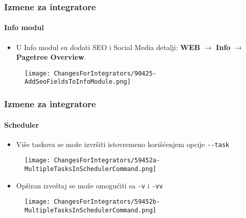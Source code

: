 
\begin{frame}[fragile]
	\frametitle{Izmene za integratore}
	\framesubtitle{Info modul}

	\begin{itemize}
		\item U Info modul su dodati SEO i Social Media detalji:\newline
			\textbf{WEB} $\rightarrow$ \textbf{Info} $\rightarrow$ \textbf{Pagetree Overview}.
	\end{itemize}

	\begin{figure}
		\texttt{[image: ChangesForIntegrators/90425-AddSeoFieldsToInfoModule.png]}
	\end{figure}

\end{frame}


\begin{frame}[fragile]
	\frametitle{Izmene za integratore}
	\framesubtitle{Scheduler}

	\lstset{basicstyle=\tiny\ttfamily}

	\begin{itemize}
		\item Više taskova se može izvršiti istovremeno korišćenjem opcije \texttt{-}\texttt{-}\texttt{task}
	\end{itemize}

	\begin{figure}
		\texttt{[image: ChangesForIntegrators/59452a-MultipleTasksInSchedulerCommand.png]}
	\end{figure}

	\begin{itemize}
		\item Opširan izveštaj se može omogućiti sa \texttt{-}\texttt{v} i \texttt{-}\texttt{vv}
	\end{itemize}

	\begin{figure}
		\texttt{[image: ChangesForIntegrators/59452b-MultipleTasksInSchedulerCommand.png]}
	\end{figure}

\end{frame}

